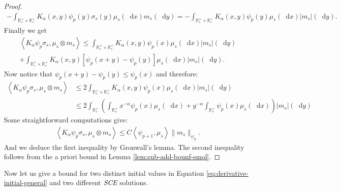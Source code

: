 \documentclass[11pt,a4paper]{article}
\newcommand{\RRP}{\mathbb{R}^+_*}
\newcommand{\SCE}{\emph{SCE}}
\newcommand{\brac}[1]{\left\langle#1\right\rangle}
\newcommand{\dd}{\mathop{}\!\mathrm{d}}
\begin{document}
\begin{proof}
    \begin{align*}
        -\int_{\RRP\times\RRP} K_\alpha(x,y) \psi_p(y)\sigma_s(y) \mu_s(\dd x) m_s(\dd y) = -\int_{\RRP\times\RRP} K_\alpha(x,y) \psi_p(y)\mu_s(\dd x) |m_s|(\dd y).
    \end{align*}
    Finally we get
    \begin{multline*}
        \brac{K_\alpha \psi_p\sigma_s, \mu_s\otimes m_s} \leq \int_{\RRP\times\RRP} K_\alpha(x,y) \psi_p(x)\mu_s(\dd x)|m_s|(\dd y) \\
        +  \int_{\RRP\times\RRP} K_\alpha(x,y) \left[\psi_p(x+y) - \psi_p(y) \right]\mu_s(\dd x)|m_s|(\dd y).
    \end{multline*}
    Now notice that $\psi_p(x+y) - \psi_p(y) \leq \psi_p(x)$ and therefore:
    \begin{align*}
        \brac{K_\alpha \psi_p\sigma_s, \mu_s\otimes m_s} 
        &\leq 2\int_{\RRP\times\RRP} K_\alpha(x,y) \psi_p(x)\mu_s(\dd x)|m_s|(\dd y)\\
        &\leq 2\int_{\RRP} \left(\int_{\RRP}x^{-\alpha}\psi_p(x)\mu_s(\dd x) + y^{-\alpha} \int_{\RRP}\psi_p(x)\mu_s(\dd x)\right) |m_s|(\dd y)
    \end{align*}
    Some straightforward computations give:
    \begin{align*}
        \brac{K_\alpha \psi_p\sigma_s, \mu_s\otimes m_s}  \leq C\brac{\psi_{p+1},\mu_s} \| m_s\|_{\psi_p}.
    \end{align*}
    And we deduce the first inequality by Gronwall's lemma. The second inequality follows from the a priori bound in Lemma \ref{lem:sub-add-bounf-smol}.
\end{proof}
Now let us give a bound for two distinct initial values in Equation \eqref{eq:derivative-initial-general} and two different $\SCE$ solutions.
\end{document}
